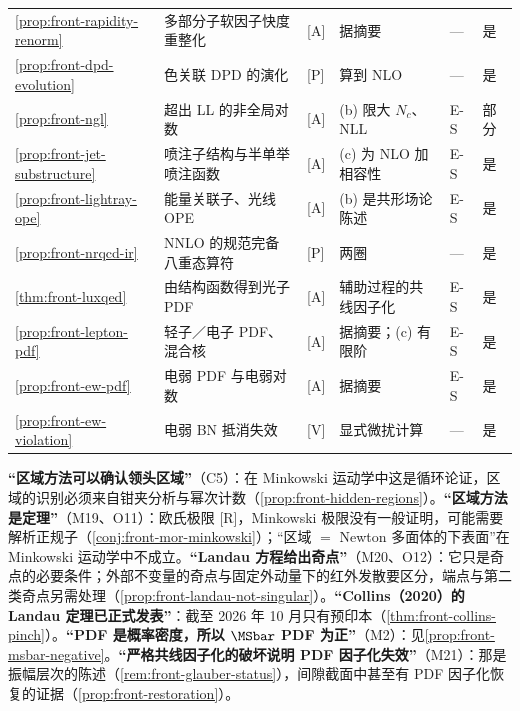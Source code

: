 \begin{table}[htbp]
\begin{tabularx}{\textwidth}{@{}p{1.75cm}>{\raggedright\arraybackslash}Xp{1.35cm}>{\raggedright\arraybackslash}p{3.6cm}p{0.75cm}p{0.95cm}@{}}
\cref{prop:front-rapidity-renorm} & 多部分子软因子快度重整化 & [A] & 据摘要 & — & 是 \\
\cref{prop:front-dpd-evolution} & 色关联 DPD 的演化 & [P] & 算到 NLO & — & 是 \\
\cref{prop:front-ngl} & 超出 LL 的非全局对数 & [A] & (b) 限大 $N_c$、NLL & E-S & 部分 \\
\cref{prop:front-jet-substructure} & 喷注子结构与半单举喷注函数 & [A] & (c) 为 NLO 加相容性 & E-S & 是 \\
\cref{prop:front-lightray-ope} & 能量关联子、光线 OPE & [A] & (b) 是共形场论陈述 & E-S & 是 \\
\cref{prop:front-nrqcd-ir} & NNLO 的规范完备八重态算符 & [P] & 两圈 & — & 是 \\
\cref{thm:front-luxqed} & 由结构函数得到光子 PDF & [A] & 辅助过程的共线因子化 & E-S & 是 \\
\cref{prop:front-lepton-pdf} & 轻子／电子 PDF、混合核 & [A] & 据摘要；(c) 有限阶 & E-S & 是 \\
\cref{prop:front-ew-pdf} & 电弱 PDF 与电弱对数 & [A] & 据摘要 & E-S & 是 \\
\cref{prop:front-ew-violation} & 电弱 BN 抵消失效 & [V] & 显式微扰计算 & — & 是 \\
\bottomrule
\end{tabularx}
\end{table}

\begin{tcolorbox}[enhanced,breakable,title=本章澄清的常见误解,fonttitle=\bfseries,
  colback=gray!3!white,colframe=gray!55!black,boxrule=0.6pt,arc=2pt,
  left=5pt,right=5pt,top=3pt,bottom=3pt,before skip=6pt,after skip=6pt]
\textbf{“区域方法可以确认领头区域”}（C5）：在 Minkowski 运动学中这是循环论证，区域的识别必须来自钳夹分析与幂次计数（\cref{prop:front-hidden-regions}）。\textbf{“区域方法是定理”}（M19、O11）：欧氏极限 [R]，Minkowski 极限没有一般证明，可能需要解析正规子（\cref{conj:front-mor-minkowski}）；“区域 $=$ Newton 多面体的下表面”在 Minkowski 运动学中不成立。\textbf{“Landau 方程给出奇点”}（M20、O12）：它只是奇点的必要条件；外部不变量的奇点与固定外动量下的红外发散要区分，端点与第二类奇点另需处理（\cref{prop:front-landau-not-singular}）。\textbf{“Collins（2020）的 Landau 定理已正式发表”}：截至 2026 年 10 月只有预印本（\cref{thm:front-collins-pinch}）。\textbf{“PDF 是概率密度，所以 $\MSbar$ PDF 为正”}（M2）：见\cref{prop:front-msbar-negative}。\textbf{“严格共线因子化的破坏说明 PDF 因子化失效”}（M21）：那是振幅层次的陈述（\cref{rem:front-glauber-status}），间隙截面中甚至有 PDF 因子化恢复的证据（\cref{prop:front-restoration}）。
\end{tcolorbox}

